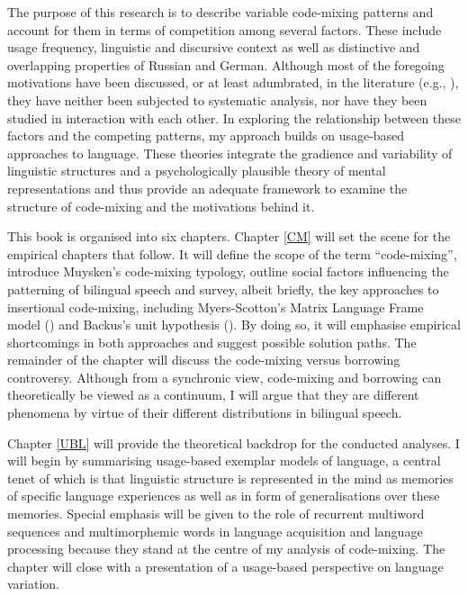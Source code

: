 The purpose of this research is to describe  variable code-mixing patterns and account for them in terms of competition among several factors. These include usage frequency, linguistic and discursive context as well as distinctive and overlapping properties of Russian and German. Although most of the foregoing motivations have been discussed, or at least adumbrated, in the literature (e.g., \citealt{myers-scotton-duelling-1993,myers-scotton-contact-2002,backus-two-1996,backus-units-2003,boumans-syntax-1998,muysken-bilingual-2000,}), they have neither been subjected to systematic analysis, nor have they been studied in interaction with each other. In exploring the relationship between these factors and the competing patterns, my approach builds on usage-based approaches to language. These theories integrate the gradience and variability of linguistic structures and a psychologically plausible theory of mental representations and thus provide an adequate framework to examine the structure of code-mixing and the motivations behind it.

This book is organised into six chapters. Chapter \ref{CM} will set the scene for the empirical chapters that follow. It will define the scope of the term “code-mixing”, introduce Muysken's \citeyear{muysken-bilingual-2000} code-mixing typology, outline social factors influencing the patterning of bilingual speech and survey, albeit briefly, the key approaches to insertional code-mixing, including Myers-Scotton's Matrix Language Frame model (\citeyear{myers-scotton-contact-2002,myers-scotton-duelling-1993}) and Backus's unit hypothesis (\citeyear{backus-units-2003}). By doing so, it will emphasise empirical shortcomings in both approaches and suggest possible solution paths. The remainder of the chapter will discuss the code-mixing versus borrowing controversy. Although from a synchronic view, code-mixing and borrowing can theoretically be viewed as a continuum, I will argue that they are different phenomena by virtue of their different distributions in bilingual speech.

Chapter \ref{UBL} will provide the theoretical backdrop for the conducted analyses. I will begin by summarising usage-based exemplar models of language, a central tenet of which is that linguistic structure is represented in the mind as memories of specific language experiences as well as in form of generalisations over these memories. Special emphasis will be given to the role of recurrent multiword sequences and multimorphemic words in language acquisition and language processing because they stand at the centre of my analysis of code-mixing. The chapter will close with a presentation of a usage-based perspective on language variation.


